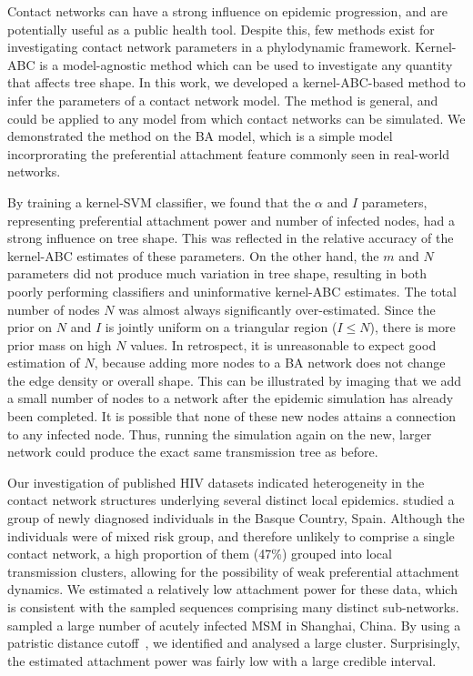\documentclass[12pt]{article}\usepackage[]{graphicx}\usepackage[]{color}
\begin{document}
Contact networks can have a strong influence on epidemic progression, and are
potentially useful as a public health tool. Despite this, few methods exist for
investigating contact network parameters in a phylodynamic framework.
Kernel-ABC is a model-agnostic method which can be used to investigate any
quantity that affects tree shape. In this work, we developed a kernel-ABC-based
method to infer the parameters of a contact network model. The method is
general, and could be applied to any model from which contact networks can be
simulated. We demonstrated the method on the \gls{BA} model, which is a simple 
model incorprorating the preferential attachment feature commonly seen in
real-world networks. 

By training a kernel-SVM classifier, we found that the $\alpha$ and $I$
parameters, representing preferential attachment power and number of infected
nodes, had a strong influence on tree shape. This was reflected in the relative
accuracy of the kernel-ABC estimates of these parameters. On the other hand,
the $m$ and $N$ parameters did not produce much variation in tree shape,
resulting in both poorly performing classifiers and uninformative kernel-ABC
estimates. The total number of nodes $N$ was almost always significantly
over-estimated. Since the prior on $N$ and $I$ is jointly uniform on a
triangular region ($I \leq N$), there is more prior mass on high $N$ values. In
retrospect, it is unreasonable to expect good estimation of $N$, because adding
more nodes to a \gls{BA} network does not change the edge density or overall
shape. This can be illustrated by imaging that we add a small number of nodes
to a network after the epidemic simulation has already been completed. It is
possible that none of these new nodes attains a connection to any infected
node. Thus, running the simulation again on the new, larger network could
produce the exact same transmission tree as before.

Our investigation of published HIV datasets indicated heterogeneity in the
contact network structures underlying several distinct local epidemics.
\textcite{cuevas2009hiv} studied a group of newly diagnosed individuals in the
Basque Country, Spain. Although the individuals were of mixed risk group, and
therefore unlikely to comprise a single contact network, a high proportion of
them (47\%) grouped into local transmission clusters, allowing for the
possibility of weak preferential attachment dynamics. We estimated a relatively
low attachment power for these data, which is consistent with the sampled
sequences comprising many distinct sub-networks. \textcite{li2015} sampled a
large number of acutely infected \gls{MSM} in Shanghai, China. By using a
patristic distance cutoff~\autocite{poon2014impact}, we identified and analysed
a large cluster. Surprisingly, the estimated attachment power was fairly low
with a large credible interval.
\end{document}
